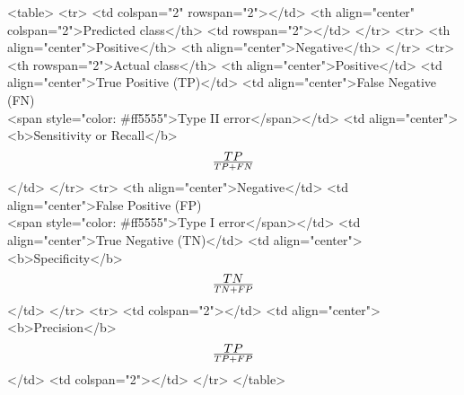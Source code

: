 <table>
  <tr>
    <td colspan="2" rowspan="2"></td>
    <th align="center" colspan="2">Predicted class</th>
    <td rowspan="2"></td>
  </tr>
  <tr>
    <th align="center">Positive</th>
    <th align="center">Negative</th>
  </tr>
  <tr>
    <th rowspan="2">Actual class</th>
    <th align="center">Positive</td>
    <td align="center">True Positive (TP)</td>
    <td align="center">False Negative (FN)\\<span style="color: \#ff5555">Type II error</span></td>
    <td align="center"><b>Sensitivity or Recall</b> \[TP \over TP + FN\]</td>
  </tr>
  <tr>
    <th align="center">Negative</td>
    <td align="center">False Positive (FP)\\<span style="color: \#ff5555">Type I error</span></td>
    <td align="center">True Negative (TN)</td>
    <td align="center"><b>Specificity</b> \[TN \over TN + FP\]</td>
  </tr>
  <tr>
    <td colspan="2"></td>
    <td align="center"><b>Precision</b> \[TP \over TP + FP\]</td>
    <td colspan="2"></td>
  </tr>
</table>


